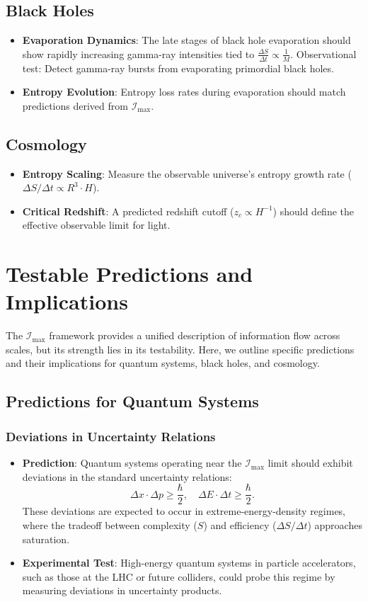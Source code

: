 \documentclass[12pt]{article}
\begin{document}
\subsection{Black Holes}
\begin{itemize}
    \item \textbf{Evaporation Dynamics}: The late stages of black hole evaporation should show rapidly increasing gamma-ray intensities tied to \( \frac{\Delta S}{\Delta t} \propto \frac{1}{M} \). Observational test: Detect gamma-ray bursts from evaporating primordial black holes.
    \item \textbf{Entropy Evolution}: Entropy loss rates during evaporation should match predictions derived from \( \mathcal{I}_{\text{max}} \).
\end{itemize}

\subsection{Cosmology}
\begin{itemize}
    \item \textbf{Entropy Scaling}: Measure the observable universe’s entropy growth rate (\( \Delta S / \Delta t \propto R^3 \cdot H \)).
    \item \textbf{Critical Redshift}: A predicted redshift cutoff (\( z_c \propto H^{-1} \)) should define the effective observable limit for light.
\end{itemize}

\section{Testable Predictions and Implications}
The \( \mathcal{I}_{\text{max}} \) framework provides a unified description of information flow across scales, but its strength lies in its testability. Here, we outline specific predictions and their implications for quantum systems, black holes, and cosmology.

\subsection{Predictions for Quantum Systems}
\subsubsection{Deviations in Uncertainty Relations}
\begin{itemize}
    \item \textbf{Prediction}: Quantum systems operating near the \( \mathcal{I}_{\text{max}} \) limit should exhibit deviations in the standard uncertainty relations:
    \[
    \Delta x \cdot \Delta p \geq \frac{\hbar}{2}, \quad \Delta E \cdot \Delta t \geq \frac{\hbar}{2}.
    \]
    These deviations are expected to occur in extreme-energy-density regimes, where the tradeoff between complexity (\( S \)) and efficiency (\( \Delta S / \Delta t \)) approaches saturation.
    \item \textbf{Experimental Test}: High-energy quantum systems in particle accelerators, such as those at the LHC or future colliders, could probe this regime by measuring deviations in uncertainty products.
\end{itemize}
\end{document}
